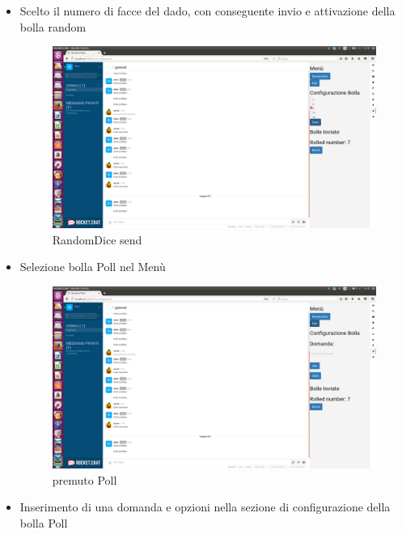 \documentclass[10 pt,a4paper, openany]{article}
\begin{document}
\begin{enumerate}
\begin{itemize}
			\item Scelto il numero di facce del dado, con conseguente invio e attivazione della bolla random
			
				\FloatBarrier
				\begin{figure}[ht]
					\centering
					\includegraphics[scale=0.20]{img/3.png}
					\caption{RandomDice send}
				\end{figure}
				
			\clearpage
			
			\item Selezione bolla Poll nel Menù
			
				\FloatBarrier
				\begin{figure}[ht]
					\centering
					\includegraphics[scale=0.20]{img/4.png}
					\caption{premuto Poll}
				\end{figure}
			\clearpage
			
			\item Inserimento di una domanda e opzioni nella sezione di configurazione della bolla Poll
			

\end{itemize}
\end{enumerate}
\end{document}
